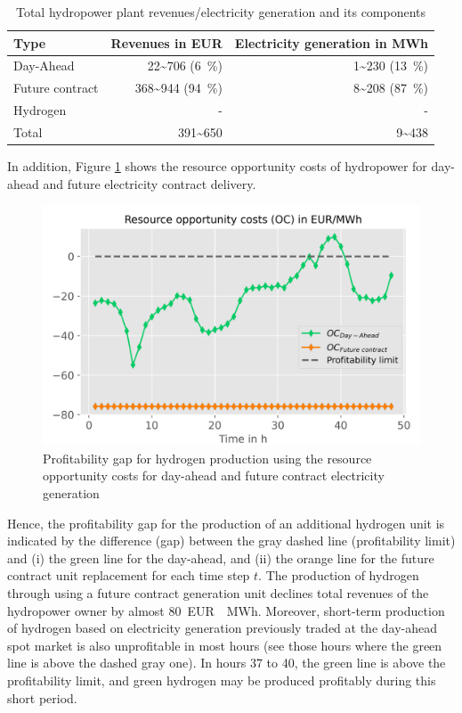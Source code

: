 \documentclass[review]{elsarticle}
\begin{document}
\begin{table}[h]
	\setlength{\extrarowheight}{.5em}
	\centering
	\begin{tabular}{lrr}
		\toprule
		Type & Revenues in EUR & Electricity generation in MWh \\
		\hline 
		Day-Ahead    & \SI{22~706}{} (\SI{6}{\%}) & \SI{1~230}{} (\SI{13}{\%})\\
		Future contract & \SI{368~944}{} (\SI{94}{\%})& \SI{8~208}{} (\SI{87}{\%})\\
		Hydrogen    & - & -\\
		\hline 
		Total & \SI{391~650}{} & \SI{9~438}{}\\
		\bottomrule
	\end{tabular}
	\caption{Total hydropower plant revenues/electricity generation and its components}
	\label{tab:revenues}
\end{table}

In addition, Figure \ref{fig:profit_gap} shows the resource opportunity costs of hydropower for day-ahead and future electricity contract delivery. 

\begin{figure}[h]
	\centering
	\includegraphics[width=0.9\linewidth]{figures/Profitability gap.png}
	\caption{Profitability gap for hydrogen production using the resource opportunity costs for day-ahead and future contract electricity generation}
	\label{fig:profit_gap}
\end{figure}

Hence, the profitability gap for the production of an additional hydrogen unit is indicated by the difference (gap) between the gray dashed line (profitability limit) and (i) the green line for the day-ahead, and (ii) the orange line for the future contract unit replacement for each time step $t$. The production of hydrogen through using a future contract generation unit declines total revenues of the hydropower owner by almost \SI{80}{EUR \per MWh}. Moreover, short-term production of hydrogen based on electricity generation previously traded at the day-ahead spot market is also unprofitable in most hours (see those hours where the green line is above the dashed gray one). In hours \SI{37}{} to \SI{40}{}, the green line is above the profitability limit, and green hydrogen may be produced profitably during this short period.
\end{document}
